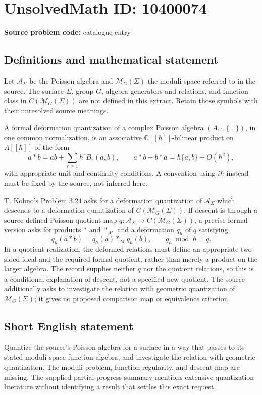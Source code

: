\documentclass[11pt]{article}
\newcommand{\C}{\mathbb{C}}
\begin{document}
\section*{UnsolvedMath ID: 10400074}
\textbf{Source problem code:} catalogue entry
\subsection{Definitions and mathematical statement}
Let \(\mathcal A_\Sigma\) be the Poisson algebra and \(\mathcal M_G(\Sigma)\) the moduli space referred to in the source. The surface \(\Sigma\), group \(G\), algebra generators and relations, and function class in \(C(\mathcal M_G(\Sigma))\) are not defined in this extract. Retain those symbols with their unresolved source meanings.

A formal deformation quantization of a complex Poisson algebra \((A,\cdot,\{\ ,\ \})\), in one common normalization, is an associative \(\C[[\hbar]]\)-bilinear product on \(A[[\hbar]]\) of the form
\[
 a*b=ab+\sum_{r\ge1}\hbar^r B_r(a,b),\qquad
 a*b-b*a=\hbar\{a,b\}+O(\hbar^2),
\]
with appropriate unit and continuity conditions. A convention using \(i\hbar\) instead must be fixed by the source, not inferred here.

T. Kohno's Problem 3.24 asks for a deformation quantization of \(\mathcal A_\Sigma\) which descends to a deformation quantization of \(C(\mathcal M_G(\Sigma))\). If descent is through a source-defined Poisson quotient map \(q:\mathcal A_\Sigma\to C(\mathcal M_G(\Sigma))\), a precise formal version asks for products \(*\) and \(*_{\mathcal M}\) and a deformation \(q_\hbar\) of \(q\) satisfying
\[
 q_\hbar(a*b)=q_\hbar(a)*_{\mathcal M}q_\hbar(b),
 \qquad q_\hbar\bmod\hbar=q.
\]
In a quotient realization, the deformed relations must define an appropriate two-sided ideal and the required formal quotient, rather than merely a product on the larger algebra. The record supplies neither \(q\) nor the quotient relations, so this is a conditional explanation of descent, not a specified new quotient. The source additionally asks to investigate the relation with geometric quantization of \(\mathcal M_G(\Sigma)\); it gives no proposed comparison map or equivalence criterion.
\subsection{Short English statement}
Quantize the source's Poisson algebra for a surface in a way that passes to its stated moduli-space function algebra, and investigate the relation with geometric quantization. The moduli problem, function regularity, and descent map are missing. The supplied partial-progress summary mentions extensive quantization literature without identifying a result that settles this exact request.
\end{document}
